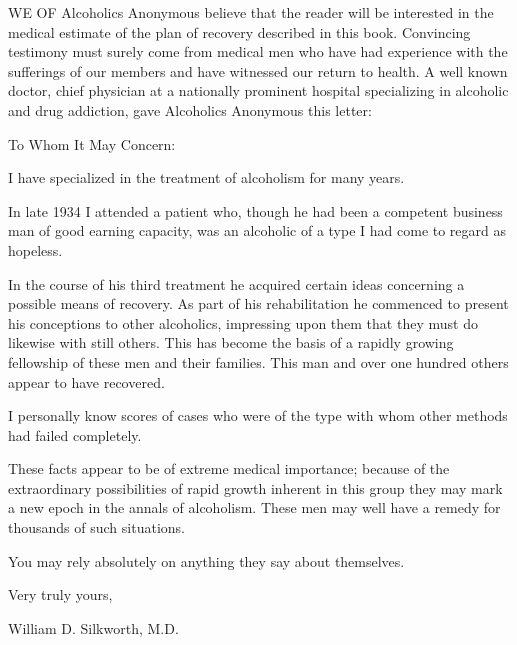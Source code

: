 
\bbChapterPreamble

\blindtext


\begin{biblechapter}
    WE OF Alcoholics Anonymous believe that the reader will be interested 
    in the medical estimate of the plan of recovery described in this book. 
\verse Convincing testimony must surely come from medical men 
    who have had experience with the sufferings of our members 
    and have witnessed our return to health. 
\verse A well known doctor, 
    chief physician at a nationally prominent hospital 
    specializing in alcoholic and drug addiction, 
    gave Alcoholics Anonymous this letter:
\end{biblechapter}


\begin{biblechapter}
    To Whom It May Concern:

\verse I have specialized in the treatment of alcoholism for many years.

    In late 1934 I attended a patient who, 
    though he had been a competent business man of good earning capacity, 
    was an alcoholic of a type I had come to regard as hopeless.

\verse In the course of his third treatment 
    he acquired certain ideas concerning a possible means of recovery. 
\verse As part of his rehabilitation 
    he commenced to present his conceptions to other alcoholics, 
    impressing upon them that they must do likewise with still others. 
\verse This has become the basis of a rapidly growing fellowship 
    of these men and their families. 
\verse This man and over one hundred others appear to have recovered.

    I personally know scores of cases who were of the type 
    with whom other methods had failed completely.

    These facts appear to be of extreme medical importance; 
    because of the extraordinary possibilities 
    of rapid growth inherent in this group 
    they may mark a new epoch in the annals of alcoholism. 
\verse These men may well have a remedy for thousands of such situations.

\verse You may rely absolutely on anything they say about themselves.

\verse Very truly yours, 

William D. Silkworth, M.D.
\end{biblechapter}



